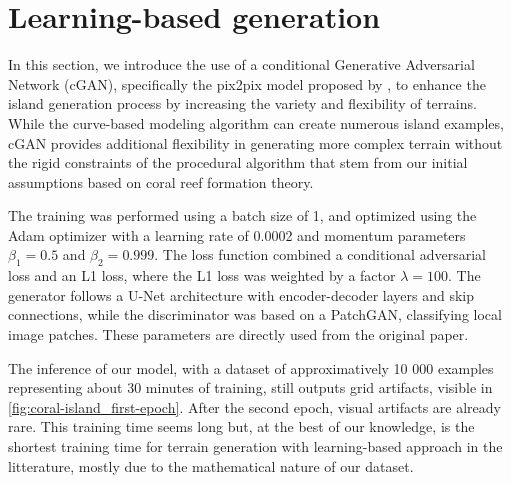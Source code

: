 \section{Learning-based generation}
\label{sec:coral-island_learning-based}


In this section, we introduce the use of a conditional Generative Adversarial Network (cGAN), specifically the pix2pix model proposed by \cite{Isola2017}, to enhance the island generation process by increasing the variety and flexibility of terrains. While the curve-based modeling algorithm can create numerous island examples, cGAN provides additional flexibility in generating more complex terrain without the rigid constraints of the procedural algorithm that stem from our initial assumptions based on coral reef formation theory. 

% 

The training was performed using a batch size of 1, and optimized using the Adam optimizer with a learning rate of 0.0002 and momentum parameters $\beta_1 = 0.5$ and $\beta_2 = 0.999$. The loss function combined a conditional adversarial loss and an L1 loss, where the L1 loss was weighted by a factor $\lambda = 100$. The generator follows a U-Net architecture with encoder-decoder layers and skip connections, while the discriminator was based on a PatchGAN, classifying local image patches. These parameters are directly used from the original paper.

The inference of our model, with a dataset of approximatively 10 000 examples representing about 30 minutes of training, still outputs grid artifacts, visible in \cref{fig:coral-island_first-epoch}. After the second epoch, visual artifacts are already rare. This training time seems long but, at the best of our knowledge, is the shortest training time for terrain generation with learning-based approach in the litterature, mostly due to the mathematical nature of our dataset.

